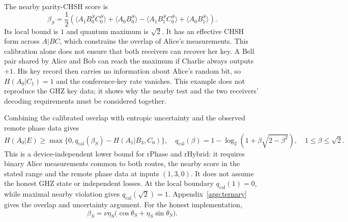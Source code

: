 \documentclass[aps,10pt,onecolumn,prx,superscriptaddress,longbibliography,nofootinbib]{revtex4-2}
\newcommand{\rPhase}{\mathrm{rPhase}}
\newcommand{\rHybrid}{\mathrm{rHybrid}}
\begin{document}
The nearby parity-CHSH score is
\begin{equation}
 \beta_S=\frac12\left(
 \langle A_1B_0^{S}C_0^{S}\rangle
 +\langle A_0B_0^{S}\rangle
 -\langle A_1B_1^{S}C_0^{S}\rangle
 +\langle A_0B_1^{S}\rangle
 \right).
 \label{eq:near-score}
\end{equation}
Its local bound is $1$ and quantum maximum is $\sqrt2$. It has an effective CHSH form across $A|BC$, which constrains the overlap of Alice's measurements. This calibration alone does not ensure that both receivers can recover her key. A Bell pair shared by Alice and Bob can reach the maximum if Charlie always outputs \(+1\). His key record then carries no information about Alice's random bit, so \(H(A_0|C_1)=1\) and the conference-key rate vanishes. This example does not reproduce the GHZ key data; it shows why the nearby test and the two receivers' decoding requirements must be considered together.

Combining the calibrated overlap with entropic uncertainty and the observed remote phase data gives~\cite{Lim2013,TanWolf2024}
\begin{equation}
 H(A_0|E)\geq
 \max\{0,q_{\mathrm{cal}}(\beta_S)-H(A_1|B_3,C_0)\},
 \quad
 q_{\mathrm{cal}}(\beta)=1-\log_2\!\left(1+\beta\sqrt{2-\beta^2}\right),
 \quad 1\leq\beta\leq\sqrt2.
 \label{eq:analytic-entropy}
\end{equation}
This is a device-independent lower bound for $\rPhase$ and $\rHybrid$: it requires binary Alice measurements common to both routes, the nearby score in the stated range and the remote phase data at inputs $(1,3,0)$. It does not assume the honest GHZ state or independent losses. At the local boundary $q_{\mathrm{cal}}(1)=0$, while maximal nearby violation gives $q_{\mathrm{cal}}(\sqrt2)=1$. Appendix~\ref{app:ternary} gives the overlap and uncertainty argument. For the honest implementation,
\begin{equation}
 \beta_S=\nu\eta_S\bigl(\cos\theta_S+\eta_S\sin\theta_S\bigr).
 \label{eq:near-target-score}
\end{equation}
\end{document}
